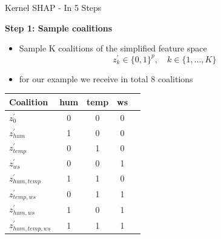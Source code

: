 \documentclass[11pt,compress,t,notes=noshow, aspectratio=169, xcolor=table]{beamer}
\begin{document}
\begin{vbframe}{Kernel SHAP - In 5 Steps}


\textbf{Step 1: Sample coalitions}
\begin{itemize}
    \item Sample K coalitions of the simplified feature space
    $$z_{k}^{\prime} \in\{0,1\}^{p}, \quad k \in\{1, \ldots, K\}$$
    \item for our example we receive in total 8 coalitions
\end{itemize}

\begin{table}[]
    \centering
     \begin{tabular}{l |cccc}
  Coalition &  hum & temp & ws \\
  \hline 
  $z^{\prime}_{0}$ & 0 & 0 & 0  \\
   $z^{\prime}_{hum}$ & 1 & 0 & 0  \\
    $z^{\prime}_{temp}$ & 0 & 1 & 0  \\
     $z^{\prime}_{ws}$ & 0 & 0 & 1  \\
     $z^{\prime}_{hum, temp}$ & 1 & 1 & 0  \\
     $z^{\prime}_{temp, ws}$ & 0 & 1 & 1  \\
     $z^{\prime}_{hum, ws}$ & 1 & 0 & 1  \\
  $z^{\prime}_{hum, temp, ws}$ & 1 & 1 & 1  \\
  
 
  \end{tabular}
\end{table}

\end{vbframe}
\end{document}
